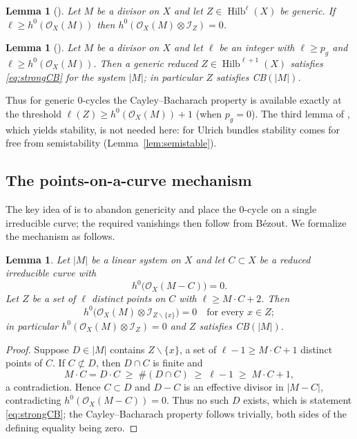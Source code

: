 \documentclass[10pt,a4paper]{amsart}
\newtheorem{lemma}[theorem]{Lemma}
\newcommand{\OO}{\mathcal{O}}
\newcommand{\II}{\mathcal{I}}
\newcommand{\Hilb}{\operatorname{Hilb}}
\newcommand{\len}{\ell}
\begin{document}
\begin{lemma}[{\cite[Lem.~2.4]{LQ94}}]\label{lem:LQ24}
Let $M$ be a divisor on $X$ and let $Z\in\Hilb^{\len}(X)$ be generic. If $\len\ge h^0(\OO_X(M))$ then $h^0(\OO_X(M)\otimes\II_Z)=0$.
\end{lemma}

\begin{lemma}[{\cite[Lem.~2.5]{LQ94}}]\label{lem:LQ25}
Let $M$ be a divisor on $X$ and let $\len$ be an integer with $\len\ge p_g$ and $\len\ge h^0(\OO_X(M))$. Then a generic reduced $Z\in\Hilb^{\len+1}(X)$ satisfies \eqref{eq:strongCB} for the system $|M|$; in particular $Z$ satisfies \textup{CB}$(|M|)$.
\end{lemma}

Thus for generic $0$-cycles the Cayley--Bacharach property is available exactly at the threshold $\len(Z)\ge h^0(\OO_X(M))+1$ (when $p_g=0$). The third lemma of \cite{LQ94}, which yields stability, is not needed here: for Ulrich bundles stability comes for free from semistability (Lemma~\ref{lem:semistable}).

\subsection{The points-on-a-curve mechanism}\label{subsec:Anghel}
The key idea of \cite{An94} is to abandon genericity and place the $0$-cycle on a single irreducible curve; the required vanishings then follow from B\'ezout. We formalize the mechanism as follows.

\begin{lemma}\label{lem:bezout}
Let $|M|$ be a linear system on $X$ and let $C\subset X$ be a reduced irreducible curve with
\[
h^0\bigl(\OO_X(M-C)\bigr)=0 .
\]
Let $Z$ be a set of $\len$ distinct points on $C$ with $\len\ge M\cdot C+2$. Then
\[
h^0\bigl(\OO_X(M)\otimes\II_{Z\smallsetminus\{x\}}\bigr)=0\quad\text{for every }x\in Z;
\]
in particular $h^0(\OO_X(M)\otimes\II_Z)=0$ and $Z$ satisfies \textup{CB}$(|M|)$.
\end{lemma}

\begin{proof}
Suppose $D\in|M|$ contains $Z\smallsetminus\{x\}$, a set of $\len-1\ge M\cdot C+1$ distinct points of $C$. If $C\not\subset D$, then $D\cap C$ is finite and
\[
M\cdot C=D\cdot C\;\ge\;\#(D\cap C)\;\ge\;\len-1\;\ge\;M\cdot C+1,
\]
a contradiction. Hence $C\subset D$ and $D-C$ is an effective divisor in $|M-C|$, contradicting $h^0(\OO_X(M-C))=0$. Thus no such $D$ exists, which is statement \eqref{eq:strongCB}; the Cayley--Bacharach property follows trivially, both sides of the defining equality being zero.
\end{proof}
\end{document}
